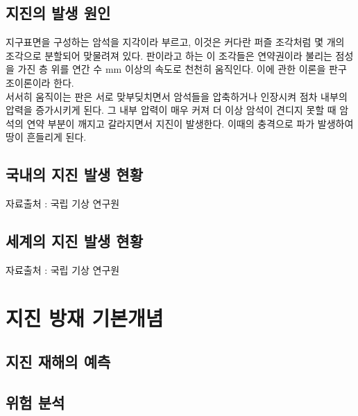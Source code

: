 \documentclass[12pt, a4paper, oneside]{book}
\begin{document}
	\clearpage
	\section{지진의 발생 원인}

	
	지구표면을 구성하는 암석을 지각이라 부르고, 이것은 커다란 퍼즐 조각처럼 몇 개의 조각으로 분할되어 맞물려져 있다.
	판이라고 하는 이 조각들은 연약권이라 불리는 점성을 가진 층 위를 연간 수 mm 이상의 속도로 천천히 움직인다.
	이에 관한 이론을 판구조이론이라 한다. \\
	
	서서히 움직이는 판은 서로 맞부딪치면서 암석들을 압축하거나 인장시켜 점차 내부의 압력을 증가시키게 된다.
	그 내부 압력이 매우 커져 더 이상 암석이 견디지 못할 때 암석의 연약 부분이 깨지고 갈라지면서 지진이 발생한다.
	이때의 충격으로 파가 발생하여 땅이 흔들리게 된다.
	
	
	\clearpage
	\section{국내의 지진 발생 현황}


	자료출처 : 국립 기상 연구원

	\clearpage
	\section{세계의 지진 발생 현황}

	자료출처 : 국립 기상 연구원



	\clearpage
	\chapter{지진 방재 기본개념}




	\clearpage
	\section{지진 재해의 예측}


	\clearpage
	\section{위험 분석}
\end{document}
